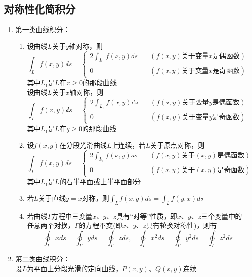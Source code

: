 \documentclass[12pt,a4paper,UTF8]{book}
\begin{document}
\subsection{对称性化简积分}
\begin{enumerate}
\item 第一类曲线积分：
\begin{enumerate}
\item 设曲线$L$关于$y$轴对称，则
\[\int_{L}f\left(x,y\right)ds=
\left\{\begin{aligned}
2\int_{L_1}f\left(x,y\right)ds\quad&\left(f\left(x,y\right)\text{关于变量}x\text{是偶函数}\right)\\
0\qquad&\left(f\left(x,y\right)\text{关于变量}x\text{是奇函数}\right)
\end{aligned}\right.\]
其中$L_1$是$L$在$x\ge0$的那段曲线\\
设曲线$L$关于$x$轴对称，则
\[\int_{L}f\left(x,y\right)ds=
\left\{\begin{aligned}
2\int_{L_1}f\left(x,y\right)ds\quad&\left(f\left(x,y\right)\text{关于变量}y\text{是偶函数}\right)\\
0\qquad&\left(f\left(x,y\right)\text{关于变量}y\text{是奇函数}\right)
\end{aligned}\right.\]
其中$L_1$是$L$在$y\ge0$的那段曲线
\item 设$f\left(x,y\right)$在分段光滑曲线$L$上连续，若$L$关于原点对称，则
\[\int_{L}f\left(x,y\right)ds=
\left\{\begin{aligned}
2\int_{L_1}f\left(x,y\right)ds\quad&\left(f\left(x,y\right)\text{关于}\left(x,y\right)\text{是偶函数}\right)\\
0\qquad&\left(f\left(x,y\right)\text{关于}\left(x,y\right)\text{是奇函数}\right)
\end{aligned}\right.\]
其中$L_1$是$L$的右半平面或上半平面部分
\item 若$L$关于直线$y=x$对称，则$\int_{L}f\left(x,y\right)ds=\int_{L}f\left(y,x\right)ds$
\item 若曲线$\Gamma$方程中三变量$x$、$y$、$z$具有“对等”性质，即$x$、$y$、$z$三个变量中的任意两个对换，$\Gamma$的方程不变(即$x$、$y$、$z$具有轮换对称性)，则有
\[\oint_{\Gamma}xds=\oint_{\Gamma}yds=\oint_{\Gamma}zds,\quad\oint_{\Gamma}x^2ds=\oint_{\Gamma}y^2ds=\oint_{\Gamma}z^2ds\]
\end{enumerate}
\item 第二类曲线积分：\\
设$L$为平面上分段光滑的定向曲线，$P\left(x,y\right)$、$Q\left(x,y\right)$连续
\begin{enumerate}

\end{enumerate}
\end{enumerate}
\end{document}
